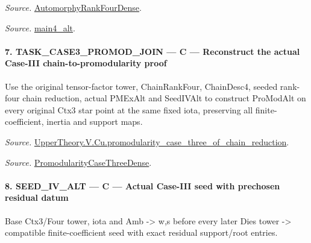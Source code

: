 \emph{Source.} \href{https://github.com/CocoSgt/riemann-hypothesis-lean/blob/7cbf7a0c32fca1badf05931879a37c3f8a2b03b4/src/Development/AutomorphicArithmetic/AutomorphicVarieties/ModularityArgument/ThresholdArguments/DenseThresholdCases/PromodularityCaseThree.lean#L43-L44}{AutomorphyRankFourDense}.

\emph{Source.} \href{https://github.com/CocoSgt/riemann-hypothesis-lean/blob/7cbf7a0c32fca1badf05931879a37c3f8a2b03b4/src/Development/AutomorphicArithmetic/AutomorphicVarieties/ModularityArgument/ThresholdArguments/DenseThresholdCases/CuFinal.lean#L44-L44}{main4\_\allowbreak alt}.



\paragraph{7. TASK\_\allowbreak CASE3\_\allowbreak PROMOD\_\allowbreak JOIN — C — Reconstruct the actual Case-III chain-to-promodularity proof}

Use the original tensor-factor tower, ChainRankFour, ChainDesc4, seeded rank-four chain reduction, actual PMExAlt and SeedIVAlt to construct ProModAlt on every original Ctx3 star point at the same fixed iota, preserving all finite-coefficient, inertia and support maps.

\emph{Source.} \href{https://github.com/CocoSgt/riemann-hypothesis-lean/blob/7cbf7a0c32fca1badf05931879a37c3f8a2b03b4/src/Development/AutomorphicArithmetic/AutomorphicVarieties/ModularityArgument/ThresholdArguments/DenseThresholdCases/PromodularityCaseThreeOfLemmas.lean#L131-L153}{UpperTheory.V.Cu.promodularity\_\allowbreak case\_\allowbreak three\_\allowbreak of\_\allowbreak chain\_\allowbreak reduction}.

\emph{Source.} \href{https://github.com/CocoSgt/riemann-hypothesis-lean/blob/7cbf7a0c32fca1badf05931879a37c3f8a2b03b4/src/Development/AutomorphicArithmetic/AutomorphicVarieties/ModularityArgument/ThresholdArguments/DenseThresholdCases/PromodularityCaseThree.lean#L40-L42}{PromodularityCaseThreeDense}.



\paragraph{8. SEED\_\allowbreak IV\_\allowbreak ALT — C — Actual Case-III seed with prechosen residual datum}

Base Ctx3/Four tower, iota and Amb -> w,s before every later Dies tower -> compatible finite-coefficient seed with exact residual support/root entries.

